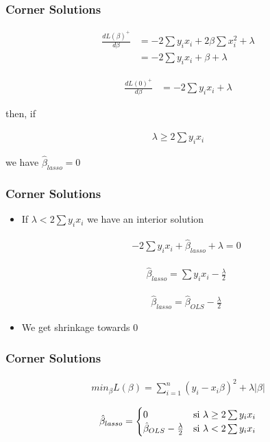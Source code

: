 \documentclass[
  shownotes,
  xcolor={svgnames},
  hyperref={colorlinks,citecolor=DarkBlue,linkcolor=DarkRed,urlcolor=DarkBlue}
  , aspectratio=169]{beamer}
\begin{document}
\begin{frame}[fragile]
\frametitle{Corner Solutions}

\begin{align}
\frac{dL(\beta)^+}{d\beta} &= -2 \sum y_ix_i+ 2 \beta \sum x_i^2 + \lambda \nonumber \\
& = -2 \sum y_ix_i +\beta + \lambda
\end{align}

\begin{align}
\frac{dL(0)^+}{d\beta} &= -2 \sum y_ix_i + \lambda \nonumber 
\end{align}

then, if 

\begin{align}
   \lambda \geq 2 \sum y_ix_i 
\end{align}

we have $\hat{\beta}_{lasso}=0$

 \end{frame}
\begin{frame}[fragile]
\frametitle{Corner Solutions}

\begin{itemize}


\item If  $\lambda < 2 \sum y_ix_i $ we have an interior solution

\begin{align}
  -2 \sum y_ix_i + \hat{\beta}_{lasso} + \lambda =0
\end{align}

\medskip
\begin{align}
    \hat{\beta}_{lasso} =\sum y_ix_i  - \frac{\lambda}{2}
\end{align}

\medskip
\begin{align}
    \hat{\beta}_{lasso} =  \hat{\beta}_{OLS} - \frac{\lambda}{2}
\end{align}

\item We get \textcolor{andesred}{shrinkage towards 0}
\end{itemize}


 \end{frame}
\begin{frame}[fragile]
\frametitle{Corner Solutions}

\begin{align}
min_{\beta} L(\beta) = \sum_{i=1}^n (y_i-x_i \beta)^2 + \lambda|\beta| 
\end{align}

\medskip
\begin{align}
\hat{\beta}_{lasso}=\begin{cases}
0 & \text{\text{si} }\ensuremath{\lambda\geq2\sum y_{i}x_{i}}\\
\hat{\beta}_{OLS}-\frac{\lambda}{2} & \text{\text{si} }\ensuremath{\lambda<2\sum y_{i}x_{i}}
\end{cases}
\end{align}



 \end{frame}
\end{document}
